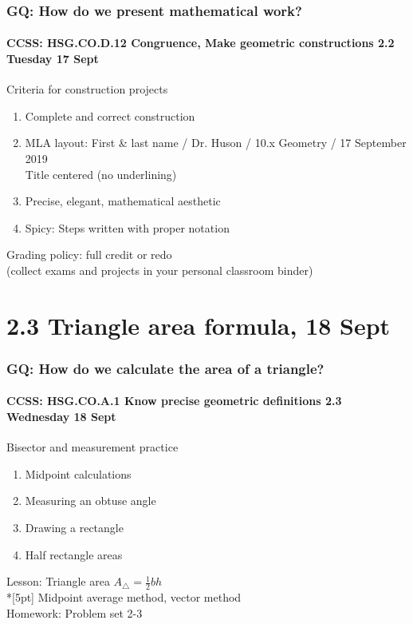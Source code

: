 \documentclass{beamer}
\begin{document}
  \frame
  {
    \frametitle{GQ: How do we present mathematical work?}
    \framesubtitle{CCSS: HSG.CO.D.12 Congruence, Make geometric constructions  \hfill \alert{2.2 Tuesday 17 Sept}}

    \begin{block}{Criteria for construction projects}
    \begin{enumerate}
        \item Complete and correct construction
        \item MLA layout: First \& last name / Dr. Huson / 10.x Geometry / 17 September 2019 \\
        Title centered (no underlining)
        \item Precise, elegant, mathematical aesthetic
        \item Spicy: Steps written with proper notation
    \end{enumerate}
    \end{block}
    Grading policy: full credit or redo\\[5pt]
    (collect exams and projects in your personal classroom binder)
  }

\section{2.3 Triangle area formula, 18 Sept}
    \frame
    {
      \frametitle{GQ: How do we calculate the area of a triangle?}
      \framesubtitle{CCSS: HSG.CO.A.1 Know precise geometric definitions \hfill \alert{2.3 Wednesday 18 Sept}}
  
      \begin{block}{Bisector and measurement practice}
      \begin{enumerate}
        \item Midpoint calculations
        \item Measuring an obtuse angle
        \item Drawing a rectangle
        \item Half rectangle areas
      \end{enumerate}
      \end{block}
      Lesson: Triangle area $A_{\triangle} = \frac{1}{2}bh$ \\*[5pt]
      Midpoint average method, vector method\\ \smallskip
      Homework: Problem set 2-3 
    }
\end{document}
